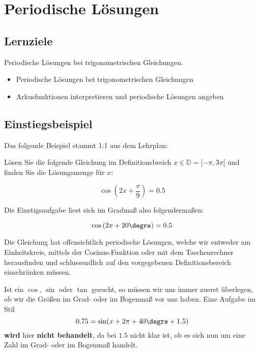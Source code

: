 
\section{Periodische Lösungen}

\subsection*{Lernziele}

Periodische Lösungen bei trigonometrischen Gleichungen.

\begin{itemize}
\item Periodische Lösungen bei trigonometrischen Gleichungen
\item Arkusfunktionen interpretieren und periodische Lösungen angeben
\end{itemize}



\subsection{Einstiegsbeispiel}
Das folgende Beispiel stammt 1:1 aus dem Lehrplan:

Lösen Sie die folgende Gleichung im Definitionsbreich $x \in \mathbb{D} = [ -\pi, 3\pi[$ und finden Sie die Lösungsmenge für $x$:

$$\cos\left(2x+\frac{\pi}{9}\right) = 0.5$$

Die Einstigsaufgabe liest sich im Gradmaß also folgendermaßen:

$$\cos\left(2x+20\degre\right) = 0.5$$

Die Gleichung hat offensichtlich periodische Lösungen, welche wir entweder am Einheitskreis, mittels der Cosinus-Funktion oder mit dem Taschenrechner herausfinden und schlussendlich auf den vorgegebenen Definitionsbereich einschränken müssen.


\begin{bemerkung}{}{}
  Ist ein $\cos$, $\sin$ oder $\tan$ gesucht, so müssen wir uns immer zuerst überlegen, ob wir die Größen im Grad- oder im Bogenmaß vor uns haben. Eine Aufgabe im Stil $$0.75 = \sin(x + 2\pi + 40\degre + 1.5)$$ \textbf{wird} hier \textbf{nicht behandelt}, da bei $1.5$ nicht klar ist, ob es sich nun um eine Zahl im Grad- oder im Bogenmaß handelt.
  \end{bemerkung}

